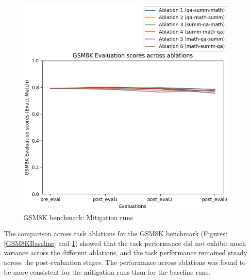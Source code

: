 \begin{figure}[H]
\begin{minipage}{0.45\textwidth}
        \includegraphics[width=1.1\textwidth]{Figures/results/trace_mitigation_graphs/gsm8k/gsm8k_eval_mitigation.png}
        \captionsetup{width=1.1\textwidth}
        \caption{GSM8K benchmark: Mitigation runs}
        \label{GSM8KMitigation}
    \end{minipage}
\end{figure}

The comparison across task ablations for the GSM8K benchmark (Figures: \ref{GSM8KBaseline} and \ref{GSM8KMitigation}) showed that the task performance did not exhibit much variance across the different ablations, and the task performance remained steady across the post-evaluation stages. The performance across ablations was found to be more consistent for the mitigation runs than for the baseline runs.

